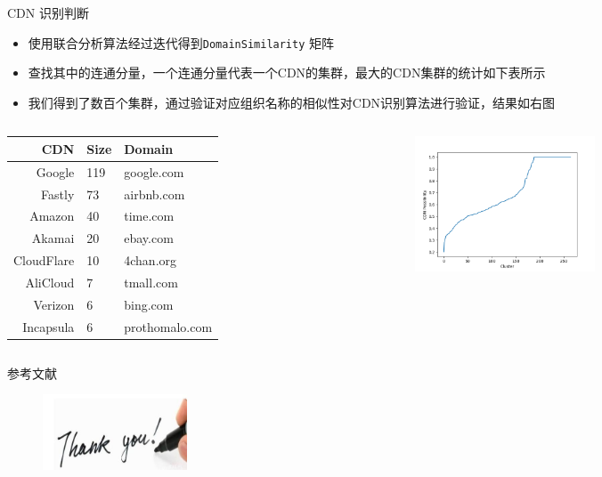 \documentclass{beamer}
\begin{document}
\begin{frame}{CDN 识别判断}
  \begin{itemize}
    \item 使用联合分析算法经过迭代得到\texttt{DomainSimilarity} 矩阵
    \item 查找其中的连通分量，一个连通分量代表一个CDN的集群，最大的CDN集群的统计如下表所示
    \item 我们得到了数百个集群，通过验证对应组织名称的相似性对CDN识别算法进行验证，结果如右图
  \end{itemize}
  \begin{columns}
      
    \begin{column}{0.5\textwidth}
      \begin{table}
        \tiny
        \begin{tabular}{r l l}
          \toprule
          CDN &Size &Domain\\
          \midrule	
         Google &	119 & google.com \\
         Fastly & 73 & airbnb.com \\
         Amazon  &	40 & time.com\\
         Akamai & 20 & ebay.com \\
         CloudFlare & 10 & 4chan.org \\
         AliCloud & 7 & tmall.com \\
         Verizon & 6 & bing.com \\
         Incapsula & 6 & prothomalo.com \\
          \bottomrule
          \end{tabular}
      \end{table}
  
    \end{column}
    \begin{column}{0.5\textwidth}
      \begin{figure}
        \centering
        \includegraphics[height=4cm]{figures/cluster.png}
        \label{fig:resolvercy}
      \end{figure}
    \end{column}
    \end{columns}
\end{frame}
 \begin{frame}{参考文献}
  \tiny
  
\end{frame}

\begin{frame}
  \begin{figure}
    \includegraphics[height=2.23cm,width=4.29cm]{images/thank.jpg}
  \end{figure} 
\end{frame}
\end{document}

